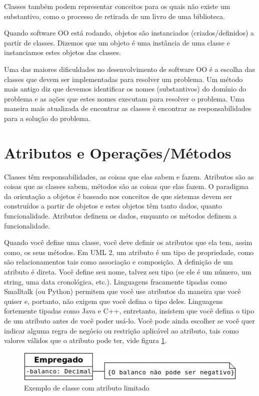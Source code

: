 Classes também podem representar conceitos para os quais não existe um substantivo, como o processo de retirada de um livro de uma biblioteca.

Quando software OO está rodando, objetos são instanciados (criados/definidos) a partir de classes. Dizemos que um objeto é uma instância de uma classe e instanciamos estes objetos das classes.

Uma das maiores dificuldades no desenvolvimento de software OO é a escolha das classes que devem ser implementadas para resolver um problema. Um método mais antigo diz que devemos identificar os nomes (substantivos) do domínio do problema e as ações que  estes nomes executam para resolver o problema. Uma maneira mais atualizada de encontrar as classes é encontrar as responsabilidades para a solução do problema.

\section{Atributos e Operações/Métodos}

Classes têm responsabilidades, as coisas que elas sabem e fazem. Atributos são as coisas que as classes sabem, métodos são as coisas que elas fazem. O paradigma da orientação a objetos é baseado nos conceitos de que sistemas devem ser construídos a partir de objetos e estes objetos têm tanto dados, quanto funcionalidade. Atributos definem os dados, enquanto os métodos definem a funcionalidade.

Quando você define uma classe, você deve definir os atributos que ela tem, assim como, os seus métodos. Em UML 2, um atributo é um tipo de propriedade, como são relacionamentos tais como associação e composição. A definição de um atributo é direta. Você define seu nome, talvez seu tipo (se ele é um número, um string, uma data cronológica, etc.).  Linguagens fracamente tipadas como Smalltalk (ou Python) permitem que você use atributos da maneira que você quiser e, portanto, não exigem que você defina o tipo deles. Linguagens fortemente tipadas como Java e C++, entretanto, insistem que você defina o tipo de um atributo antes de você poder usá-lo. Você pode ainda escolher se você quer indicar alguma regra de negócio ou restrição aplicável ao atributo, tais como valores válidos que o atributo pode ter, vide figura \ref{fig:umlClsLmt}.

\begin{figure}[h]
\begin{center}
\includegraphics[scale=0.7]{umlClsLmt.png} 
\caption{Exemplo de classe com atributo limitado} \label{fig:umlClsLmt}
\end{center}
\end{figure}

